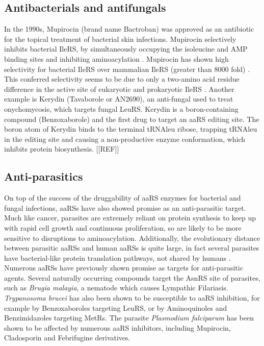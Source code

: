 \subsection{Antibacterials and antifungals}
In the 1990s, Mupirocin (brand name Bactroban) was approved as an antibiotic for the topical treatment of bacterial skin infections.
Mupirocin selectively inhibits bacterial IleRS, by simultaneously occupying the isoleucine and AMP binding sites and inhibiting aminoacylation \cite{hurdle2005prospects}.
Mupirocin has shown high selectivity for bacterial IleRS over mammalian IleRS (greater than 8000 fold) \cite{hughes1980interaction}.
This conferred selectivity seems to be due to only a two-amino acid residue difference in the active site of eukaryotic and prokaryotic IleRS \cite{nakama2001structural}.
Another example is Kerydin (Tavaborole or AN2690), an anti-fungal used to treat onychomycosis, which targets fungal LeuRS.
Kerydin is a boron-containing compound (Benzoxaborole) and the first drug to target an aaRS editing site.
The boron atom of Kerydin binds to the terminal tRNAleu ribose, trapping tRNAleu in the editing site and causing a non-productive enzyme conformation, which inhibits protein biosynthesis. [[REF]]


\subsection{Anti-parasitics}
On top of the success of the druggability of aaRS enzymes for bacterial and fungal infections, aaRSs have also showed promise as an anti-parasitic target.
Much like cancer, parasites are extremely reliant on protein synthesis to keep up with rapid cell growth and continuous proliferation, so are likely to be more sensitive to disruptions to aminoacylation.
Additionally, the evolutionary distance between parasitic aaRSs and human aaRSs is quite large, in fact several parasites have bacterial-like protein translation pathways, not shared by humans \cite{pham2014aminoacyl}.
Numerous aaRSs have previously shown promise as targets for anti-parasitic agents.
Several naturally occurring compounds target the AsnRS site of parasites, such as \textit{Brugia malayia}, a nematode which causes Lympathic Filariasis.
\textit{Trypanosoma brucei} has also been shown to be susceptible to aaRS inhibition, for example by Benzoxaboroles targeting LeuRS, or by Aminoquinoles and
Benzimidazoles targeting MetRs.
The parasite \textit{Plasmodium falciparum} has been shown to be affected by numerous aaRS inhibitors, including Mupirocin, Cladosporin and Febrifugine derivatives.

